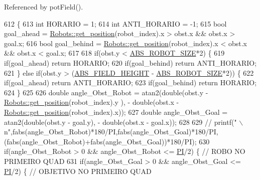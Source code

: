 Referenced by pot\+Field().


\begin{DoxyCode}
612                                                                               \{
613     \textcolor{keywordtype}{int} HORARIO = 1;
614     \textcolor{keywordtype}{int} ANTI\_HORARIO = -1;
615     \textcolor{keywordtype}{bool} goal\_ahead = \hyperlink{class_robots_a1fca8f2f5070176faa6ba1efa2f1ff14}{Robots::get\_position}(robot\_index).x > obst.x && obst.x > goal.x;
616     \textcolor{keywordtype}{bool} goal\_behind = \hyperlink{class_robots_a1fca8f2f5070176faa6ba1efa2f1ff14}{Robots::get\_position}(robot\_index).x < obst.x && obst.x < goal.x;
617 
618     \textcolor{keywordflow}{if}(obst.y < \hyperlink{namespace_c_o_n_s_t_a8d0d7fe4341b9129cabd565ef16a0640}{ABS\_ROBOT\_SIZE}*2) \{
619         \textcolor{keywordflow}{if}(goal\_ahead) \textcolor{keywordflow}{return} HORARIO;
620         \textcolor{keywordflow}{if}(goal\_behind) \textcolor{keywordflow}{return} ANTI\_HORARIO;
621     \} \textcolor{keywordflow}{else} \textcolor{keywordflow}{if}(obst.y > (\hyperlink{namespace_c_o_n_s_t_a42a76a781b7cd424616b37ec9d720f98}{ABS\_FIELD\_HEIGHT} - \hyperlink{namespace_c_o_n_s_t_a8d0d7fe4341b9129cabd565ef16a0640}{ABS\_ROBOT\_SIZE}*2)) \{
622         \textcolor{keywordflow}{if}(goal\_ahead) \textcolor{keywordflow}{return} ANTI\_HORARIO;
623         \textcolor{keywordflow}{if}(goal\_behind) \textcolor{keywordflow}{return} HORARIO;
624     \}
625 
626     \textcolor{keywordtype}{double} angle\_Obst\_Robot = atan2(\textcolor{keywordtype}{double}(obst.y - \hyperlink{class_robots_a1fca8f2f5070176faa6ba1efa2f1ff14}{Robots::get\_position}(robot\_index).y
      ), - \textcolor{keywordtype}{double}(obst.x - \hyperlink{class_robots_a1fca8f2f5070176faa6ba1efa2f1ff14}{Robots::get\_position}(robot\_index).x));
627     \textcolor{keywordtype}{double} angle\_Obst\_Goal = atan2(\textcolor{keywordtype}{double}(obst.y - goal.y), - \textcolor{keywordtype}{double}(obst.x - goal.x));
628 
629     \textcolor{comment}{// printf("%
       \(\backslash\)n",fabs(angle\_Obst\_Robot)*180/PI,fabs(angle\_Obst\_Goal)*180/PI,(fabs(angle\_Obst\_Robot)+fabs(angle\_Obst\_Goal))*180/PI);}
630     \textcolor{keywordflow}{if}(angle\_Obst\_Robot > 0 && angle\_Obst\_Robot <= \hyperlink{strategy_8cpp_a598a3330b3c21701223ee0ca14316eca}{PI}/2) \{ \textcolor{comment}{// ROBO NO PRIMEIRO QUAD}
631         \textcolor{keywordflow}{if}(angle\_Obst\_Goal > 0 && angle\_Obst\_Goal <= \hyperlink{strategy_8cpp_a598a3330b3c21701223ee0ca14316eca}{PI}/2) \{ \textcolor{comment}{// OBJETIVO NO PRIMEIRO QUAD}

\end{DoxyCode}
